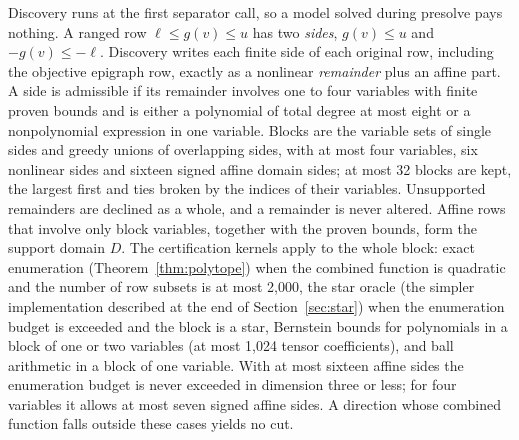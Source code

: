 Discovery runs at the first separator call, so a model solved during presolve
pays nothing. A ranged row $\ell\le g(v)\le u$ has two \emph{sides},
$g(v)\le u$ and $-g(v)\le-\ell$. Discovery writes each finite side of each
original row, including the objective epigraph row, exactly as a nonlinear
\emph{remainder} plus an affine part. A side is admissible if its remainder
involves one to four variables with finite proven bounds and is either a
polynomial of total degree at most eight or a nonpolynomial expression in one
variable. Blocks are the variable sets of single sides and greedy unions of
overlapping sides, with at most four variables, six nonlinear sides and
sixteen signed affine domain sides; at most 32 blocks are kept, the largest
first and ties broken by the indices of their variables. Unsupported
remainders are declined as a whole, and a remainder is never altered. Affine
rows that involve only block variables, together with the proven bounds, form
the support domain $D$. The certification kernels apply to the whole block:
exact enumeration (Theorem~\ref{thm:polytope}) when the combined function is
quadratic and the number of row subsets is at most 2{,}000, the star oracle
(the simpler implementation described at the end of Section~\ref{sec:star})
when the enumeration budget is exceeded and the block is a star, Bernstein
bounds for polynomials in a block of one or two variables (at most 1{,}024
tensor coefficients), and ball arithmetic in a block of one variable. With at
most sixteen affine sides the enumeration budget is never exceeded in
dimension three or less; for four variables it allows at most seven signed
affine sides. A direction whose combined function falls outside these cases
yields no cut.

